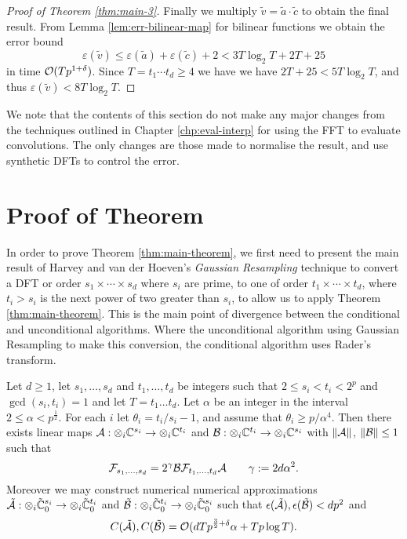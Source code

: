 \begin{proof}[Proof of Theorem \eqref{thm:main-3}]
    Finally we multiply $\tilde{v} = \tilde{a} \cdot \tilde{c}$ to obtain the final result. From Lemma \ref{lem:err-bilinear-map} for bilinear functions we obtain the error bound
    \[
        \varepsilon(\tilde{v}) \le \varepsilon(\tilde{a}) + \varepsilon(\tilde{c}) + 2 < 3 T \log_2 T + 2T + 25
    \]
    in time $\mathcal O(Tp^{1 + \delta})$. Since $T = t_1\cdots t_d \ge 4$ we have we have $2T + 25 < 5T \log_2 T$, and thus $\varepsilon(\tilde{v}) < 8T\log_2 T$.
\end{proof}

We note that the contents of this section do not make any major changes from the techniques outlined in Chapter \ref{chp:eval-interp} for using the FFT to evaluate convolutions. The only changes are those made to normalise the result, and use synthetic DFTs to control the error. 

\section{Proof of Theorem}%
\label{sec:proof-of-theorem}

In order to prove Theorem \ref{thm:main-theorem}, we first need to present the main result of Harvey and van der Hoeven's \emph{Gaussian Resampling} technique to convert a DFT or order $s_1 \times \cdots \times s_d$ where $s_i$ are prime, to one of order $t_1 \times \cdots \times t_d$, where $t_i > s_i$ is the next power of two greater than $s_i$, to allow us to apply Theorem \ref{thm:main-theorem}. This is the main point of divergence between the conditional and unconditional algorithms. Where the unconditional algorithm using Gaussian Resampling to make this conversion, the conditional algorithm uses Rader's transform.

\begin{theorem}\label{thm:gaussian}
    Let $d \geq 1$, let $s_1, \ldots, s_d$ and $t_1, \ldots, t_d$ be integers such that $2 \leq s_i < t_i < 2^p$ and $\gcd(s_i, t_i) = 1$ and let $T = t_1\ldots t_d$. Let $\alpha$ be an integer in the interval $2 \leq \alpha < p^{\frac{1}{2}}$. For each $i$ let $\theta_i = t_i / s_i - 1$, and assume that $\theta_i \geq p/\alpha^4$. Then there exists linear maps $\mathcal A: \otimes_i {\mathbb C}^{s_i} \to \otimes_i {\mathbb C}^{t_i}$ and $\mathcal B: \otimes_i {\mathbb C}^{t_i} \to \otimes_i {\mathbb C}^{s_i}$ with $\|\mathcal A\|$, $\|\mathcal B\| \leq 1$ such that
    \[
        \mathcal F_{s_1, \ldots, s_d} = 2^\gamma \mathcal B \mathcal F_{t_1, \ldots, t_d} \mathcal A \qquad \gamma := 2d\alpha^2.
    \]
    Moreover we may construct numerical numerical approximations $\tilde{\mathcal A}: \otimes_i \tilde{{\mathbb C}}^{s_i}_0 \to \otimes_i \tilde{{\mathbb C}}^{t_i}_0$ and $\tilde{\mathcal B}: \otimes_i \tilde{{\mathbb C}}^{t_i}_0 \to \otimes_i \tilde{{\mathbb C}}^{s_i}_0$  such that $\epsilon(\tilde{\mathcal A}), \epsilon(\tilde{\mathcal B}) < dp^2$ and
    \[
        C(\tilde{\mathcal A}), C(\tilde{\mathcal B}) = \mathcal O(dTp^{{\frac{3}{2}} + \delta}\alpha + Tp\log T).
    \]
\end{theorem}

